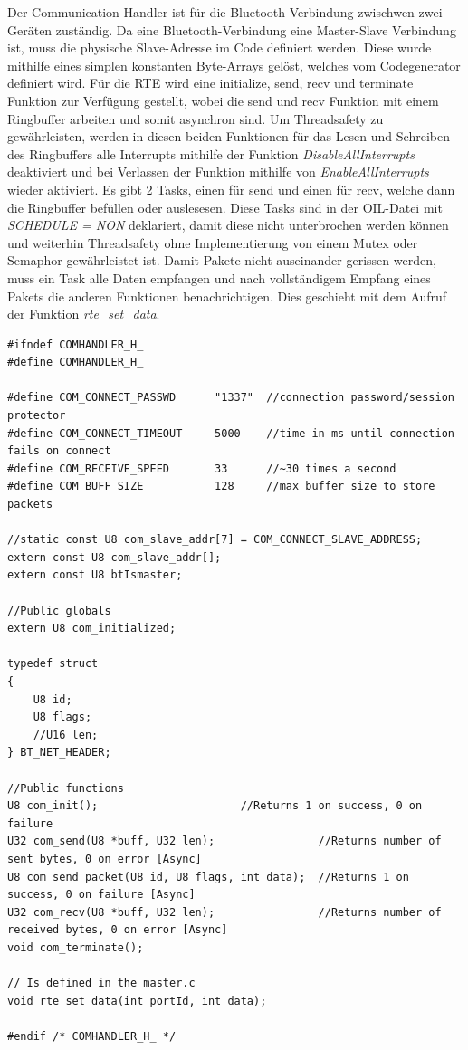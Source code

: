 Der Communication Handler ist für die Bluetooth Verbindung zwischwen zwei Geräten zuständig. Da eine Bluetooth-Verbindung eine Master-Slave Verbindung ist, muss die physische Slave-Adresse im Code definiert werden.
Diese wurde mithilfe eines simplen konstanten Byte-Arrays gelöst, welches vom Codegenerator definiert wird. Für die RTE wird eine initialize, send, recv und terminate Funktion zur Verfügung gestellt, wobei die send und recv Funktion mit einem Ringbuffer arbeiten und somit asynchron sind.
Um Threadsafety zu gewährleisten, werden in diesen beiden Funktionen für das Lesen und Schreiben des Ringbuffers alle Interrupts mithilfe der Funktion \textit{DisableAllInterrupts} deaktiviert und bei Verlassen der Funktion mithilfe von \textit{EnableAllInterrupts} wieder aktiviert.
Es gibt 2 Tasks, einen für send und einen für recv, welche dann die Ringbuffer befüllen oder auslesesen. Diese Tasks sind in der OIL-Datei mit \textit{SCHEDULE = NON} deklariert, damit diese nicht unterbrochen werden können und weiterhin Threadsafety ohne Implementierung von einem Mutex oder Semaphor gewährleistet ist.
Damit Pakete nicht auseinander gerissen werden, muss ein Task alle Daten empfangen und nach vollständigem Empfang eines Pakets die anderen Funktionen benachrichtigen. Dies geschieht mit dem Aufruf der Funktion \textit{rte\_set\_data}.

\newpage

\begin{lstlisting}[frame=single]  
#ifndef COMHANDLER_H_
#define COMHANDLER_H_

#define COM_CONNECT_PASSWD		"1337"	//connection password/session protector
#define COM_CONNECT_TIMEOUT		5000	//time in ms until connection fails on connect
#define COM_RECEIVE_SPEED		33		//~30 times a second
#define COM_BUFF_SIZE			128		//max buffer size to store packets

//static const U8 com_slave_addr[7] = COM_CONNECT_SLAVE_ADDRESS;
extern const U8 com_slave_addr[];
extern const U8 btIsmaster;

//Public globals
extern U8 com_initialized;

typedef struct
{
	U8 id;
	U8 flags;
	//U16 len;
} BT_NET_HEADER;

//Public functions
U8 com_init();						//Returns 1 on success, 0 on failure
U32 com_send(U8 *buff, U32 len);				//Returns number of sent bytes, 0 on error [Async]
U8 com_send_packet(U8 id, U8 flags, int data);	//Returns 1 on success, 0 on failure [Async]
U32 com_recv(U8 *buff, U32 len);				//Returns number of received bytes, 0 on error [Async]
void com_terminate();

// Is defined in the master.c
void rte_set_data(int portId, int data);

#endif /* COMHANDLER_H_ */
\end{lstlisting}

